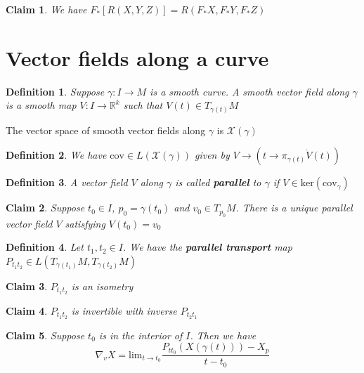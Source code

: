 \documentclass{article}
\newtheorem{definition}{Definition}
\newtheorem{claim}{Claim}
\begin{document}
\begin{claim}
    We have $F_*[R(X,Y,Z)]=R(F_*X,F_*Y,F_*Z)$
\end{claim}

\section{Vector fields along a curve}

\begin{definition}
    Suppose $\gamma: I \to M$ is a smooth curve. A smooth vector field along $\gamma$ is a smooth map $V: I \to \mathbb{R}^k$ such that $V(t) \in T_{\gamma (t)}M$
\end{definition}

The vector space of smooth vector fields along $\gamma$ is $\mathcal{X}(\gamma)$

\begin{definition}
    We have  $\text{cov} \in L(\mathcal{X}(\gamma))$ given by $V \to (t \to \pi_{\gamma(t)}\dot{V}(t))$
\end{definition}

\begin{definition}
    A vector field $V$ along $\gamma$ is called \textbf{parallel} to $\gamma$ if $V \in \text{ker} (\text{cov}_\gamma)$
\end{definition}

\begin{claim}
    Suppose $t_0 \in I$, $p_0=\gamma(t_0)$ and $v_0 \in T_{p_0}M$. There is a unique parallel vector field $V$ satisfying $V(t_0)=v_0$
\end{claim}

\begin{definition}
    Let $t_1,t_2 \in I$. We have the \textbf{parallel transport} map $P_{t_1t_2} \in L(T_{\gamma(t_1)}M,T_{\gamma(t_2)}M)$ 
\end{definition}

\begin{claim}
    $P_{t_1t_2}$ is an isometry
\end{claim}

\begin{claim}
    $P_{t_1t_2}$ is invertible with inverse $P_{t_2t_1}$
\end{claim}

\begin{claim}
    Suppose $t_0$ is in the interior of $I$. Then we have \[\nabla_vX= \text{lim}_{t \to t_0}\frac{P_{tt_0}(X(\gamma(t)))- X_p}{t-t_0}\]
\end{claim}
\end{document}
